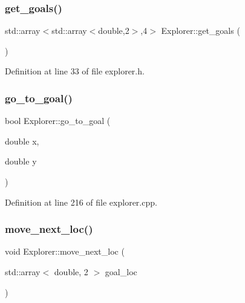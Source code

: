 \mbox{\label{class_explorer_a847e3ad2e7233d493a8dcfdd7139cb58}} 
\subsubsection{\texorpdfstring{get\+\_\+goals()}{get\_goals()}}
{\footnotesize\ttfamily std\+::array$<$std\+::array$<$double,2$>$,4$>$ Explorer\+::get\+\_\+goals (\begin{DoxyParamCaption}{ }\end{DoxyParamCaption})\hspace{0.3cm}{\ttfamily [inline]}}



Definition at line 33 of file explorer.\+h.

\mbox{\label{class_explorer_aa1e259feaac1114adb0f24588428e8ef}} 
\subsubsection{\texorpdfstring{go\+\_\+to\+\_\+goal()}{go\_to\_goal()}}
{\footnotesize\ttfamily bool Explorer\+::go\+\_\+to\+\_\+goal (\begin{DoxyParamCaption}\item[{double}]{x,  }\item[{double}]{y }\end{DoxyParamCaption})}



Definition at line 216 of file explorer.\+cpp.

\mbox{\label{class_explorer_a2b0c1e46e1a17e99f4156edf5a93b691}} 
\subsubsection{\texorpdfstring{move\+\_\+next\+\_\+loc()}{move\_next\_loc()}}
{\footnotesize\ttfamily void Explorer\+::move\+\_\+next\+\_\+loc (\begin{DoxyParamCaption}\item[{std\+::array$<$ double, 2 $>$}]{goal\+\_\+loc }\end{DoxyParamCaption})\hspace{0.3cm}{\ttfamily [inline]}}



